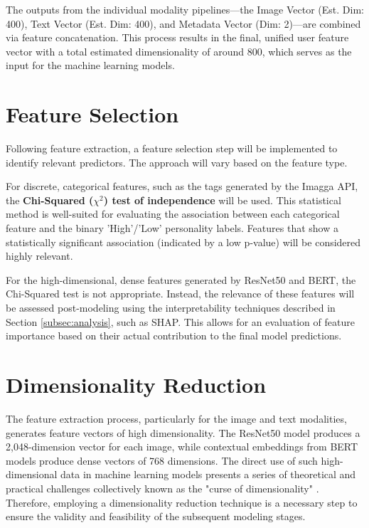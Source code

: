 The outputs from the individual modality pipelines—the Image Vector (Est. Dim: 400), Text Vector (Est. Dim: 400), and Metadata Vector (Dim: 2)—are combined via feature concatenation. This process results in the final, unified user feature vector with a total estimated dimensionality of around 800, which serves as the input for the machine learning models.

\section{Feature Selection}
Following feature extraction, a feature selection step will be implemented to identify relevant predictors. The approach will vary based on the feature type.

For discrete, categorical features, such as the tags generated by the Imagga API, the \textbf{Chi-Squared ($\chi^2$) test of independence} will be used. This statistical method is well-suited for evaluating the association between each categorical feature and the binary 'High'/'Low' personality labels. Features that show a statistically significant association (indicated by a low p-value) will be considered highly relevant.

For the high-dimensional, dense features generated by ResNet50 and BERT, the Chi-Squared test is not appropriate. Instead, the relevance of these features will be assessed post-modeling using the interpretability techniques described in Section \ref{subsec:analysis}, such as SHAP. This allows for an evaluation of feature importance based on their actual contribution to the final model predictions.

\section{Dimensionality Reduction}
\label{sec:rationale_pca}
The feature extraction process, particularly for the image and text modalities, generates feature vectors of high dimensionality. The ResNet50 model produces a 2,048-dimension vector for each image, while contextual embeddings from BERT models produce dense vectors of 768 dimensions. The direct use of such high-dimensional data in machine learning models presents a series of theoretical and practical challenges collectively known as the "curse of dimensionality" \citep{bellman1961, bellman1966}. Therefore, employing a dimensionality reduction technique is a necessary step to ensure the validity and feasibility of the subsequent modeling stages.

